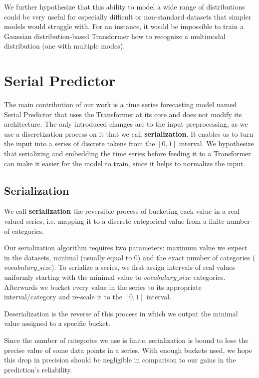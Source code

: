 \documentclass[en]{pracamgr}
\begin{document}
We further hypothesize that this ability to model a wide range of distributions could be very useful for especially difficult or non-standard datasets that simpler models would struggle with. For an instance, it would be impossible to train a Gaussian distribution-based Transformer how to recognize a multimodal distribution (one with multiple modes).

\section{Serial Predictor}
The main contribution of our work is a time series forecasting model named Serial Predictor that uses the Transformer at its core and does not modify its architecture. The only introduced changes are to the input preprocessing, as we use a discretization process on it that we call \textbf{serialization}. It enables us to turn the input into a series of discrete tokens from the $[0, 1]$ interval. We hypothesize that serializing and embedding the time series before feeding it to a Transformer can make it easier for the model to train, since it helps to normalize the input.


\subsection{Serialization}


We call \textbf{serialization} the reversible process of bucketing each value in a real-valued series, i.e. mapping it to a discrete categorical value from a finite number of categories.

Our serialization algorithm requires two parameters: maximum value we expect in the datasets, minimal (usually equal to 0) and the exact number of categories ($vocabulary\_size$).
To serialize a series, we first assign intervals of real values uniformly starting with the minimal value to $vocabulary\_size$ categories.
Afterwards we bucket every value in the series to its appropriate interval/category and re-scale it to the $[0, 1]$ interval.


Deserialization is the reverse of this process in which we output the minimal value assigned to a specific bucket. 

Since the number of categories we use is finite, serialization is bound to lose the precise value of some data points in a series. With enough buckets used, we hope this drop in precision should be negligible in comparison to our gains in the prediction's reliability. 
\end{document}
